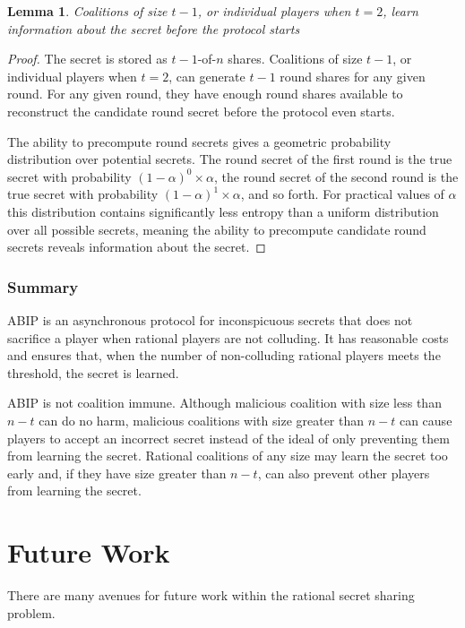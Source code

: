 \documentclass{dalcsthesis}
\newtheorem{lemma}{Lemma}
\begin{document}
\begin{lemma} Coalitions of size $t-1$, or individual players when $t=2$, learn information about the secret before the protocol starts \end{lemma}
\begin{proof}
The secret is stored as $t-1$-of-$n$ shares. Coalitions of size $t-1$, or individual players when $t=2$, can generate $t-1$ round shares for any given round. For any given round, they have enough round shares available to reconstruct the candidate round secret before the protocol even starts.

The ability to precompute round secrets gives a geometric probability distribution over potential secrets. The round secret of the first round is the true secret with probability $(1-\alpha)^0 \times \alpha$, the round secret of the second round is the true secret with probability $(1-\alpha)^1 \times \alpha$, and so forth. For practical values of $\alpha$ this distribution contains significantly less entropy than a uniform distribution over all possible secrets, meaning the ability to precompute candidate round secrets reveals information about the secret.
\end{proof}

\subsection{Summary}

ABIP is an asynchronous protocol for inconspicuous secrets that does not sacrifice a player when rational players are not colluding. It has reasonable costs and ensures that, when the number of non-colluding rational players meets the threshold, the secret is learned.

ABIP is not coalition immune. Although malicious coalition with size less than $n-t$ can do no harm, malicious coalitions with size greater than $n-t$ can cause players to accept an incorrect secret instead of the ideal of only preventing them from learning the secret. Rational coalitions of any size may learn the secret too early and, if they have size greater than $n-t$, can also prevent other players from learning the secret.




\chapter{Future Work}
\label{chapter:Future}

There are many avenues for future work within the rational secret sharing problem.
\end{document}
